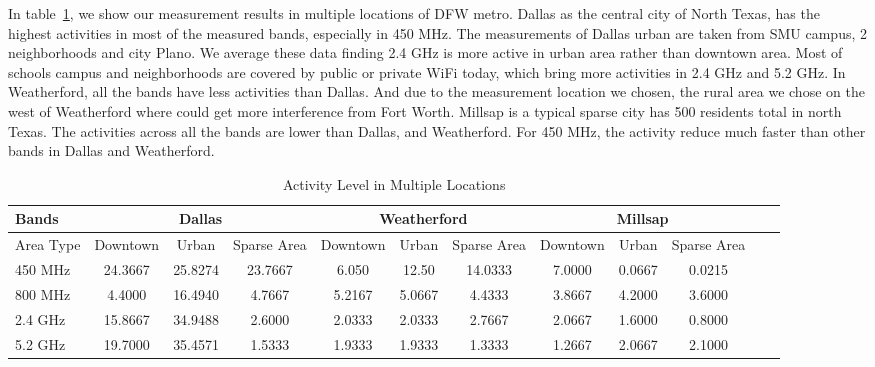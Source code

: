 In table~\ref{tab:activitymeasurement}, we show our measurement results in multiple locations of DFW metro.
Dallas as the central city of North Texas, has the highest activities in most of the measured bands,
 especially in 450 MHz. The measurements of Dallas urban are taken from SMU campus, 2 neighborhoods
 and city Plano. We average these data finding 2.4 GHz is more active in urban area rather than 
 downtown area. Most of schools campus and neighborhoods are covered by public or private WiFi today,
which bring more activities in 2.4 GHz and 5.2 GHz.
In Weatherford, all the bands have less activities than Dallas. And due to the measurement location
we chosen, the rural area we chose on the west of Weatherford where could get more interference from
Fort Worth.
Millsap is a typical sparse city has 500 residents total in north Texas. The activities across all the bands are lower than
Dallas, and Weatherford. For 450 MHz, the activity reduce much faster than other bands in Dallas
and Weatherford. 

\begin{table}
\centering %
\begin{tabular}{|l|c|c|c|c|c|c|c|c|c|c|c|} %
\hline %
Bands     & \multicolumn{3}{c|}{Dallas} & \multicolumn{3}{c|}{Weatherford} & \multicolumn{3}{c|}{Millsap} \\%
\hline %
Area Type & Downtown & Urban & Sparse Area & Downtown &  Urban   & Sparse Area & Downtown & Urban & Sparse Area \\ %
\hline %
450 MHz &24.3667	&25.8274  &23.7667	&6.050 &12.50  &14.0333 & 7.0000 & 0.0667 & 0.0215 \\      
\hline %
800 MHz &4.4000 	&16.4940  &4.7667	&5.2167&5.0667 &4.4333  & 3.8667 & 4.2000 & 3.6000 \\      
\hline %
2.4 GHz &15.8667 	&34.9488  &2.6000	&2.0333&2.0333 &2.7667  & 2.0667 & 1.6000 & 0.8000 \\      
\hline %
5.2 GHz &19.7000	&35.4571  &1.5333	&1.9333&1.9333 &1.3333  & 1.2667 & 2.0667 & 2.1000 \\      
\hline %
\end{tabular}    
\label{tab:activitymeasurement}    
\caption{Activity Level in Multiple Locations} %
\vspace{-0.4in}
\end{table}    

